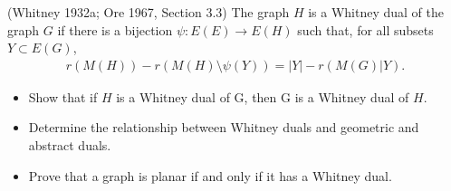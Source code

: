 \prob
{
    (Whitney 1932a; Ore 1967, Section 3.3) The graph $H$ is a Whitney dual of the graph $G$ if there is a bijection 
    $\psi : E(E) \rightarrow E(H)$ such that, for all subsets $Y \subset E(G)$,
    \begin{align}
            r(M(H)) - r(M(H)\setminus \psi(Y)) = |Y| - r(M(G)|Y).
    \end{align}
    \begin{itemize}[label=(\roman*)]
        \item Show that if $H$ is a Whitney dual of G, then G is a Whitney dual of $H$.
        \item Determine the relationship between Whitney duals and geometric and abstract duals.
        \item Prove that a graph is planar if and only if it has a Whitney dual.
    \end{itemize}
}